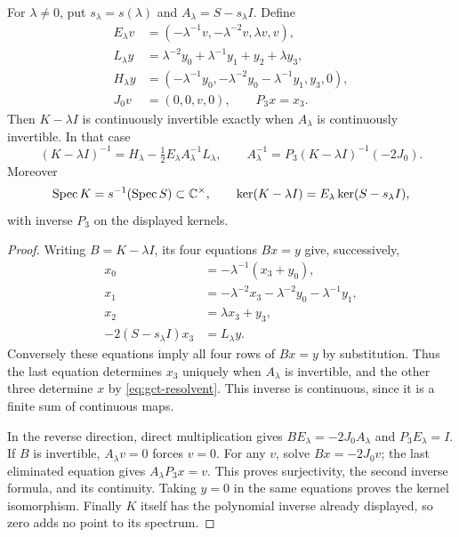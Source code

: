 \begin{theorem}\label{thm:gct-resolvent}
For $\lambda\ne0$, put $s_\lambda=s(\lambda)$ and
$A_\lambda=S-s_\lambda I$. Define
\begin{align*}
 E_\lambda v&=(-\lambda^{-1}v,-\lambda^{-2}v,\lambda v,v),\\
 L_\lambda y&=\lambda^{-2}y_0+\lambda^{-1}y_1+y_2+\lambda y_3,\\
 H_\lambda y&=(-\lambda^{-1}y_0,
       -\lambda^{-2}y_0-\lambda^{-1}y_1,y_3,0),\\
 J_0v&=(0,0,v,0),\qquad P_3x=x_3.
\end{align*}
Then $K-\lambda I$ is continuously invertible exactly when $A_\lambda$
is continuously invertible. In that case
\begin{equation}\label{eq:gct-resolvent}
 (K-\lambda I)^{-1}
 =H_\lambda-\tfrac12E_\lambda A_\lambda^{-1}L_\lambda,
 \qquad
 A_\lambda^{-1}=P_3(K-\lambda I)^{-1}(-2J_0).
\end{equation}
Moreover
\begin{equation}\label{eq:gct-spectrum}
 \operatorname{Spec}K
 =s^{-1}(\operatorname{Spec}S)\subset\mathbb C^\times,
 \qquad
 \ker(K-\lambda I)=E_\lambda\ker(S-s_\lambda I),
\end{equation}
with inverse $P_3$ on the displayed kernels.
\end{theorem}
\begin{proof}
Writing $B=K-\lambda I$, its four equations $Bx=y$ give, successively,
\begin{align*}
 x_0&=-\lambda^{-1}(x_3+y_0),\\
 x_1&=-\lambda^{-2}x_3-\lambda^{-2}y_0-\lambda^{-1}y_1,\\
 x_2&=\lambda x_3+y_3,\\
 -2(S-s_\lambda I)x_3&=L_\lambda y.
\end{align*}
Conversely these equations imply all four rows of $Bx=y$ by substitution.
Thus the last equation determines $x_3$ uniquely when $A_\lambda$ is
invertible, and the other three determine $x$ by \eqref{eq:gct-resolvent}.
This inverse is continuous, since it is a finite sum of continuous maps.

In the reverse direction, direct multiplication gives
$BE_\lambda=-2J_0A_\lambda$ and $P_3E_\lambda=I$.
If $B$ is invertible, $A_\lambda v=0$ forces $v=0$.
For any $v$, solve $Bx=-2J_0v$; the last eliminated equation gives
$A_\lambda P_3x=v$. This proves surjectivity, the second inverse formula,
and its continuity. Taking $y=0$ in the same equations proves the kernel
isomorphism. Finally $K$ itself has the polynomial inverse already
displayed, so zero adds no point to its spectrum.
\end{proof}

